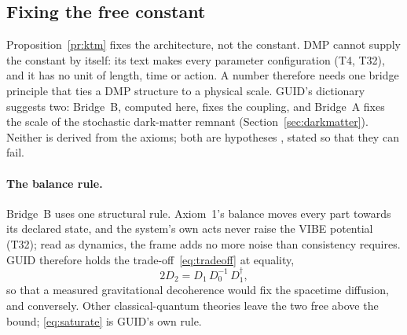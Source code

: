 \subsection{Fixing the free constant}\label{sec:bridges}

Proposition~\ref{pr:ktm} fixes the architecture, not the constant. DMP cannot supply the constant by itself: its text makes every
parameter configuration (T4, T32), and it has no unit of length, time or action. A number therefore needs one bridge principle that ties a
DMP structure to a physical scale. GUID's dictionary suggests two: Bridge~B, computed here, fixes the coupling, and Bridge~A fixes the
scale of the stochastic dark-matter remnant (Section~\ref{sec:darkmatter}). Neither is derived from the axioms; both are hypotheses \tagH,
stated so that they can fail.

\paragraph{The balance rule.} Bridge~B uses one structural rule. Axiom~1's balance moves every part towards its declared state, and the
system's own acts never raise the VIBE potential (T32); read as dynamics, the frame adds no more noise than consistency requires. GUID
therefore holds the trade-off~\eqref{eq:tradeoff} at equality,
\begin{equation}\label{eq:saturate}
2D_2=D_1\,D_0^{-1}\,D_1^{\dagger},
\end{equation}
so that a measured gravitational decoherence would fix the spacetime diffusion, and conversely. Other classical-quantum theories leave the
two free above the bound; \eqref{eq:saturate} is GUID's own rule.

